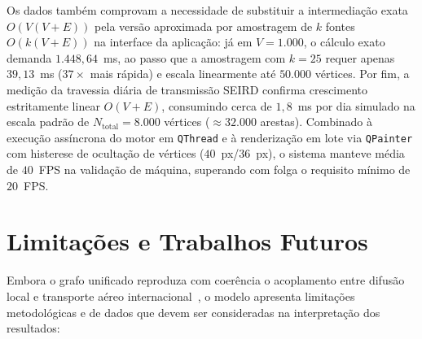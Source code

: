 \documentclass[11pt]{article}
\begin{document}
Os dados também comprovam a necessidade de substituir a intermediação exata $O(V(V+E))$ pela versão aproximada por amostragem de $k$ fontes $O(k(V+E))$ na interface da aplicação: já em $V = 1.000$, o cálculo exato demanda $1.448{,}64$~ms, ao passo que a amostragem com $k = 25$ requer apenas $39{,}13$~ms ($37\times$ mais rápida) e escala linearmente até $50.000$ vértices. Por fim, a medição da travessia diária de transmissão SEIRD confirma crescimento estritamente linear $O(V+E)$, consumindo cerca de $1{,}8$~ms por dia simulado na escala padrão de $N_{\mathrm{total}} = 8.000$ vértices ($\approx 32.000$ arestas). Combinado à execução assíncrona do motor em \texttt{QThread} e à renderização em lote via \texttt{QPainter} com histerese de ocultação de vértices ($40$~px/$36$~px), o sistema manteve média de $40$~FPS na validação de máquina, superando com folga o requisito mínimo de $20$~FPS.

\section{Limitações e Trabalhos Futuros} \label{sec:limitacoes}

Embora o grafo unificado reproduza com coerência o acoplamento entre difusão local e transporte aéreo internacional~\cite{balcan2009,brockmann2013}, o modelo apresenta limitações metodológicas e de dados que devem ser consideradas na interpretação dos resultados:
\end{document}
